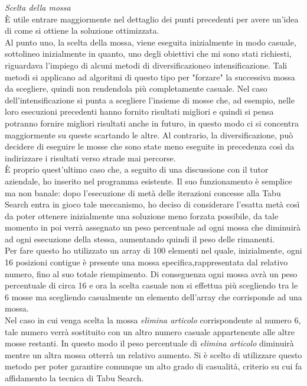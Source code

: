 \textit{Scelta della mossa}\\
È utile entrare maggiormente nel dettaglio dei punti precedenti per avere un'idea di come si ottiene la soluzione ottimizzata.\\
Al punto uno, la scelta della mossa, viene eseguita inizialmente in modo casuale, sottolineo inizialmente in quanto, uno degli obiettivi che mi sono stati richiesti, riguardava
l'impiego di alcuni metodi di diversificazione\glosp o intensificazione\glo. Tali metodi si applicano ad algoritmi di questo tipo per "forzare" la successiva mossa da scegliere,
quindi non rendendola più completamente casuale. Nel caso dell'intensificazione si punta a scegliere l'insieme di mosse che, ad esempio, nelle loro esecuzioni precedenti hanno fornito
risultati migliori e quindi si pensa potranno fornire migliori risultati anche in futuro, in questo modo ci si concentra maggiormente su queste scartando le altre.
Al contrario, la diversificazione, può decidere di eseguire le mosse che sono state meno eseguite in precedenza così da indirizzare i risultati verso strade mai 
percorse.\\ È proprio quest'ultimo caso che, a seguito di una discussione con il tutor aziendale, ho inserito nel programma esistente. Il suo funzionamento è semplice ma non banale:
dopo l'esecuzione di metà delle iterazioni concesse alla Tabu Search entra in gioco tale meccanismo, ho deciso di considerare l'esatta metà così da poter ottenere inizialmente una
soluzione meno forzata possibile, da tale momento in poi verrà assegnato un peso percentuale ad ogni mossa che diminuirà ad ogni esecuzione della stessa, aumentando quindi il 
peso delle rimanenti.\\ Per fare questo ho utilizzato un array di 100 elementi nel quale, inizialmente, ogni 16 posizioni contigue è presente una mossa specifica,rappresentata dal
relativo numero, fino al suo totale riempimento. Di conseguenza ogni mossa avrà un peso percentuale di circa 16 e ora la scelta casuale non si effettua più scegliendo tra le
6 mosse ma scegliendo casualmente un elemento dell'array che corrisponde ad una mossa.\\
Nel caso in cui venga scelta la mossa \textit{elimina articolo} corrispondente al numero 6, tale numero verrà sostituito con un altro numero casuale appartenente alle altre mosse
restanti. In questo modo il peso percentuale di \textit{elimina articolo} diminuirà mentre un altra mossa otterrà un relativo aumento. Si è scelto di utilizzare questo metodo
per poter garantire comunque un alto grado di casualità, criterio su cui fa affidamento la tecnica di Tabu Search.\\

